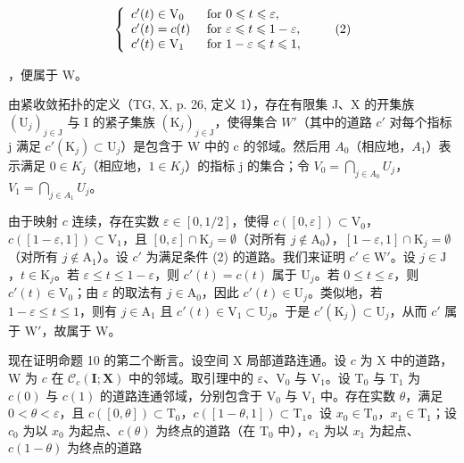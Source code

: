 \[
\left\{ \begin{array}{l l} c ^ {\prime} (t) \in \mathrm{V} _ {0} & \text { for } 0 \leqslant t \leqslant \varepsilon , \\ c ^ {\prime} (t) = c (t) & \text { for } \varepsilon \leqslant t \leqslant 1 - \varepsilon , \\ c ^ {\prime} (t) \in \mathrm{V} _ {1} & \text { for } 1 - \varepsilon \leqslant t \leqslant 1, \end{array} \right.\tag{2}
\]

，便属于 W。

由紧收敛拓扑的定义（TG, X, p. 26, 定义 1），存在有限集 J、X 的开集族 \((\mathrm{U}_{j})_{j\in\mathrm{J}}\) 与 I 的紧子集族 \((\mathrm{K}_{j})_{j\in\mathrm{J}}\)，使得集合 \(W'\)（其中的道路 \(c'\) 对每个指标 j 满足 \(c'(\mathrm{K}_{j})\subset\mathrm{U}_{j}\)）是包含于 W 中的 c 的邻域。然后用 \(A_{0}\)（相应地，\(A_{1}\)）表示满足 \(0\in K_{j}\)（相应地，\(1\in K_{j}\)）的指标 j 的集合；令 \(V_{0}=\bigcap_{j\in A_{0}}U_{j}\)，\(V_{1}=\bigcap_{j\in A_{1}}U_{j}\)。

由于映射 \(c\) 连续，存在实数 \(\varepsilon \in [0,1/2]\)，使得 \(c([0,\varepsilon]) \subset \mathrm{V}_0\)，\(c([1-\varepsilon,1]) \subset \mathrm{V}_1\)，且 \([0,\varepsilon] \cap \mathrm{K}_j = \emptyset\)（对所有 \(j \notin \mathrm{A}_0\)），\([1-\varepsilon,1] \cap \mathrm{K}_j = \emptyset\)（对所有 \(j \notin \mathrm{A}_1\)）。设 \(c'\) 为满足条件 (2) 的道路。我们来证明 \(c' \in \mathrm{W}'\)。设 \(j \in \mathrm{J}\)，\(t \in \mathrm{K}_j\)。若 \(\varepsilon \leqslant t \leqslant 1-\varepsilon\)，则 \(c'(t) = c(t)\) 属于 \(\mathrm{U}_j\)。若 \(0 \leqslant t \leqslant \varepsilon\)，则 \(c'(t) \in \mathrm{V}_0\)；由 \(\varepsilon\) 的取法有 \(j \in \mathrm{A}_0\)，因此 \(c'(t) \in \mathrm{U}_j\)。类似地，若 \(1-\varepsilon \leqslant t \leqslant 1\)，则有 \(j \in \mathrm{A}_1\) 且 \(c'(t) \in \mathrm{V}_1 \subset \mathrm{U}_j\)。于是 \(c'(\mathrm{K}_j) \subset \mathrm{U}_j\)，从而 \(c'\) 属于 \(\mathrm{W}'\)，故属于 W。

现在证明命题 10 的第二个断言。设空间 X 局部道路连通。设 \(c\) 为 X 中的道路，W 为 \(c\) 在 \(\mathcal{C}_c(\mathbf{I};\mathbf{X})\) 中的邻域。取引理中的 \(\varepsilon\)、\(\mathrm{V}_0\) 与 \(\mathrm{V}_1\)。设 \(\mathrm{T}_0\) 与 \(\mathrm{T}_1\) 为 \(c(0)\) 与 \(c(1)\) 的道路连通邻域，分别包含于 \(\mathrm{V}_0\) 与 \(\mathrm{V}_1\) 中。存在实数 \(\theta\)，满足 \(0 < \theta < \varepsilon\)，且 \(c([0,\theta]) \subset \mathrm{T}_0\)，\(c([1 - \theta,1]) \subset \mathrm{T}_1\)。设 \(x_0 \in \mathrm{T}_0\)，\(x_1 \in \mathrm{T}_1\)；设 \(c_0\) 为以 \(x_0\) 为起点、\(c(\theta)\) 为终点的道路（在 \(\mathrm{T}_0\) 中），\(c_1\) 为以 \(x_1\) 为起点、\(c(1 - \theta)\) 为终点的道路

